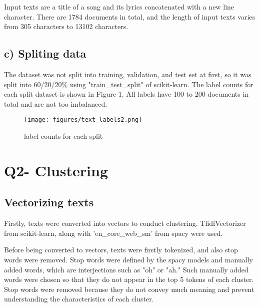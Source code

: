 \documentclass[a4paper,11pt]{article}
\begin{document}
Input texts are a title of a song and its lyrics concatenated with a new line character.
There are 1784 documents in total, 
and the length of input texts varies from 305 characters to 13102 characters.



\subsection{c) Spliting data}
The dataset was not split into training, validation, and test set at first, 
so it was split into 60/20/20\% using "train\_test\_split" of scikit-learn.
The label counts for each split dataset is shown in Figure 1.
All labels have 100 to 200 documents in total and are not too imbalanced.



\begin{figure}[htbp]
  \begin{center}
  \texttt{[image: figures/text\_labels2.png]}
  \caption{label counts for each split}
  \end{center}
\end{figure}

\section{Q2- Clustering}
\subsection{Vectorizing texts}
Firstly, texts were converted into vectors to conduct clustering.
TfidfVectorizer from scikit-learn, along with 'en\_core\_web\_sm' from spacy were used.

Before being converted to vectors, texts were firstly tokenized, and also stop words were removed.
Stop words were defined by the spacy models and manually added words, which are interjections such as "oh" or "ah."
Such manually added words were chosen so that they do not appear in the top 5 tokens of each cluster.
Stop words were removed because they do not convey much meaning and prevent understanding the characteristics of each cluster.
\end{document}

